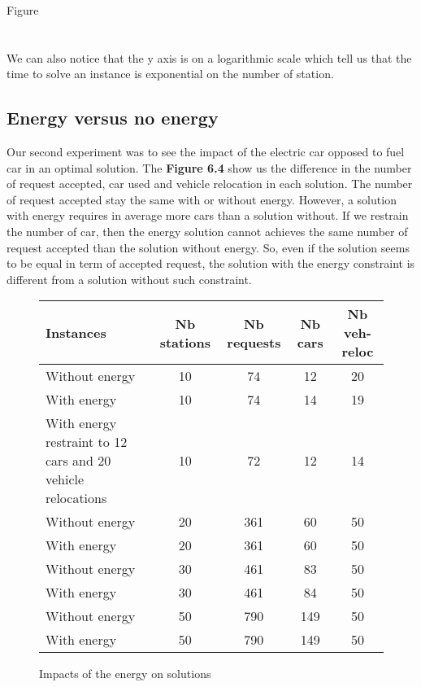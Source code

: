 \begin{bibunit}[ieeetr]
~\\~\\~\\Figure\\~\\~\\

We can also notice that the y axis is on a logarithmic scale which tell us that the time to solve an instance is exponential on the number of station.

\subsection{Energy versus no energy}
Our second experiment was to see the impact of the electric car opposed to fuel car in an optimal solution.
The \textbf{Figure 6.4} show us the difference in the number of request accepted, car used and vehicle relocation in each solution.
The number of request accepted stay the same with or without energy.
However, a solution with energy requires in average more cars  than a solution without.
If we restrain the number of car, then the energy solution cannot achieves the same number of request accepted than the solution without energy.
So, even if the solution seems to be equal in term of accepted request, the solution with  the energy constraint is different from a solution without such constraint.

\begin{figure}
\begin{tabularx}{\textwidth}{|X|c|c|c|c|}
\hline
Instances & Nb stations & Nb requests & Nb cars & Nb veh-reloc \\
\hline
Without energy & 10 & 74 & 12 & 20 \\
With energy & 10 & 74 & 14 & 19\\
\hline
With energy restraint \newline to 12 cars and 20 \newline vehicle relocations & 10 & 72 & 12 & 14\\
\hline  
Without energy & 20 & 361 & 60 & 50 \\
With energy & 20 & 361 & 60 & 50 \\
\hline
Without energy & 30 & 461 & 83 & 50\\
With energy & 30 & 461 & 84 & 50\\
\hline
Without energy & 50 & 790 & 149 & 50\\
With energy & 50 & 790 & 149 & 50\\
\hline
\end{tabularx}
\caption{Impacts of the energy on solutions}
\end{figure}


\end{bibunit}
